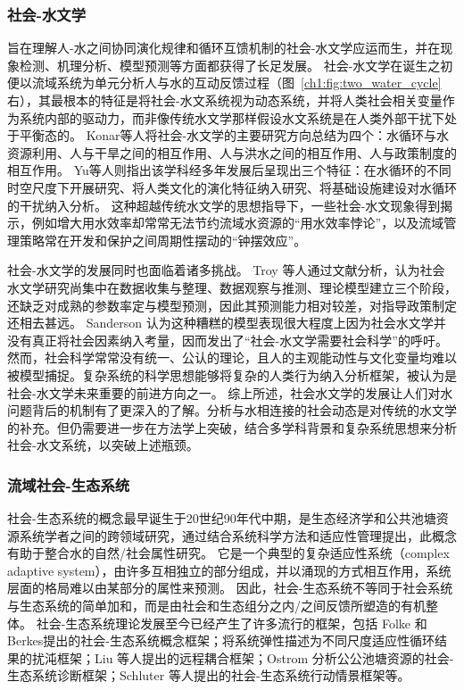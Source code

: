 \subsubsection*{社会-水文学}

旨在理解人-水之间协同演化规律和循环互馈机制的社会-水文学应运而生，并在现象检测、机理分析、模型预测等方面都获得了长足发展\cite{sivapalan2012, blair2016, srinivasan2016}。
社会-水文学在诞生之初便以流域系统为单元分析人与水的互动反馈过程（图~\ref{ch1:fig:two_water_cycle}右），其最根本的特征是将社会-水文系统视为动态系统，并将人类社会相关变量作为系统内部的驱动力，而非像传统水文学那样假设水文系统是在人类外部干扰下处于平衡态的\cite{sivapalan2012}。
Konar等人将社会-水文学的主要研究方向总结为四个：水循环与水资源利用、人与干旱之间的相互作用、人与洪水之间的相互作用、人与政策制度的相互作用\cite{konar2019}。
Yu等人则指出该学科经多年发展后呈现出三个特征：在水循环的不同时空尺度下开展研究、将人类文化的演化特征纳入研究、将基础设施建设对水循环的干扰纳入分析\cite{yu2020}。
这种超越传统水文学的思想指导下，一些社会-水文现象得到揭示，例如增大用水效率却常常无法节约流域水资源的“用水效率悖论”\cite{grafton2018, xiong2021a}，以及流域管理策略常在开发和保护之间周期性摆动的“钟摆效应”\cite{kandasamy2014, roobavannan2017, mostert2018}。

社会-水文学的发展同时也面临着诸多挑战。
Troy 等人通过文献分析，认为社会水文学研究尚集中在数据收集与整理、数据观察与推测、理论模型建立三个阶段，还缺乏对成熟的参数率定与模型预测，因此其预测能力相对较差，对指导政策制定还相去甚远\cite{troy2015}。
Sanderson 认为这种糟糕的模型表现很大程度上因为社会水文学并没有真正将社会因素纳入考量，因而发出了“社会-水文学需要社会科学”的呼吁\cite{sanderson2017}。
然而，社会科学常常没有统一、公认的理论，且人的主观能动性与文化变量均难以被模型捕捉。复杂系统的科学思想能够将复杂的人类行为纳入分析框架，被认为是社会-水文学未来重要的前进方向之一\cite{ahlstrom2021}。
综上所述，社会水文学的发展让人们对水问题背后的机制有了更深入的了解。分析与水相连接的社会动态是对传统的水文学的补充。但仍需要进一步在方法学上突破，结合多学科背景和复杂系统思想来分析社会-水文系统，以突破上述瓶颈。


\subsubsection*{流域社会-生态系统}

社会-生态系统的概念最早诞生于20世纪90年代中期，是生态经济学和公共池塘资源系统学者之间的跨领域研究，通过结合系统科学方法和适应性管理提出\cite{biggs2021}，此概念有助于整合水的自然/社会属性研究\cite{fowler2022}。
它是一个典型的复杂适应性系统（complex adaptive system），由许多互相独立的部分组成，并以涌现的方式相互作用，系统层面的格局难以由某部分的属性来预测\cite{schluter2019}。
因此，社会-生态系统不等同于社会系统与生态系统的简单加和，而是由社会和生态组分之内/之间反馈所塑造的有机整体\cite{biggs2021}。
社会-生态系统理论发展至今已经产生了许多流行的框架，包括 Folke 和 Berkes提出的社会-生态系统概念框架\cite{berkes2008}；将系统弹性描述为不同尺度适应性循环结果的扰沌框架\cite{gunderson2001}；Liu 等人提出的远程耦合框架\cite{liu2018}；Ostrom 分析公公池塘资源的社会-生态系统诊断框架\cite{ostrom2009}；Schluter 等人提出的社会-生态系统行动情景框架等\cite{schluter2019}。

